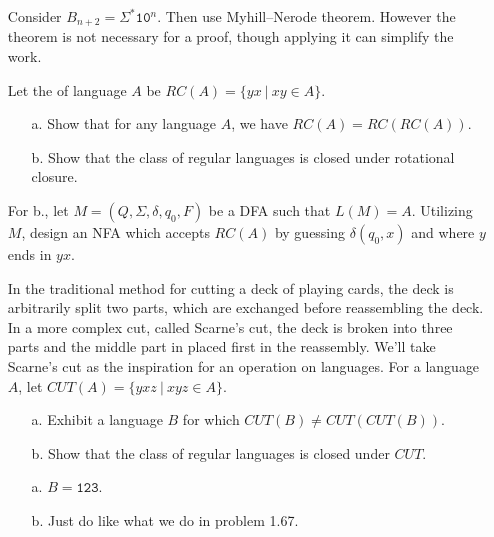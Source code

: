 \begin{itemize}
	\hint
	Consider $B_{n+2} = \Sigma^*\mathtt{1}\mathtt{0}^{n}$. Then use Myhill--Nerode theorem. However the theorem is not necessary for a proof, though applying it can simplify the work.
	
	
	\item[\hard 1.67]
	Let the  of language $A$ be $RC(A) = \{ yx \ | \ xy \in A \}$.
	\begin{itemize}
		\item[a.]
		Show that for any language $A$, we have $RC(A) = RC(RC(A))$.
		\item[b.]
		Show that the class of regular languages is closed under rotational closure.
	\end{itemize}
	\hint
	For b., let $M = (Q, \Sigma, \delta, q_0, F)$ be a DFA such that $L(M) = A$. Utilizing $M$, design an NFA which accepts $RC(A)$ by guessing $\delta(q_0, x)$ and where $y$ ends in $yx$.
	
	
	\item[\hard 1.68] 
	In the traditional method for cutting a deck of playing cards, the deck is arbitrarily
	split two parts, which are exchanged before reassembling the deck. In a more
	complex cut, called Scarne’s cut, the deck is broken into three parts and the middle
	part in placed first in the reassembly. We’ll take Scarne’s cut as the inspiration for
	an operation on languages. For a language $A$, let $CUT(A) = \{ yxz \ | \ xyz \in A \}$.
	\begin{itemize}
		\item[a.]
		Exhibit a language $B$ for which $CUT(B) \neq CUT(CUT(B))$.
		\item[b.]
		Show that the class of regular languages is closed under $CUT$.
	\end{itemize}
	\hint
	\begin{itemize}
		\item[a.]
		$B = \mathtt{123}$.
		\item[b.]
		Just do like what we do in problem 1.67.
	\end{itemize}

	
\end{itemize}